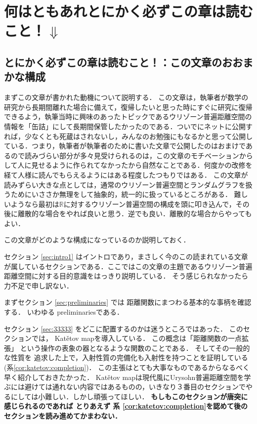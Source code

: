 \documentclass[leqno, 12pt]{jsarticle}
\newcommand{\rr}{\mathbb{R}}
\begin{document}
\section*{何はともあれとにかく必ずこの章は読むこと！$\Downarrow$}
\subsection{とにかく必ずこの章は読むこと！：この文章のおおまかな構成}

まずこの文章が書かれた動機について説明する．
この文章は，執筆者が数学の研究から長期間離れた場合に備えて，復帰したいと思った時にすぐに研究に復帰できるよう，執筆当時に興味のあったトピックであるウリゾーン普遍距離空間の情報を「缶詰」にして長期間保管したかったのである．ついでにネットに公開すれば，少なくとも死蔵はされないし，みんなのお勉強にもなるかと思って公開している．つまり，執筆者が執筆者のために書いた文章で公開したのはおまけであるので読みづらい部分が多々見受けられるのは，この文章のモチベーションからして人に見せるように作られてなかったから自然なことである．何度かの改修を経て人様に読んでもらえるようにはある程度したつもりではある．
この文章が読みずらい大きな点としては，通常のウリゾーン普遍空間とランダムグラフを扱うためにいささか無理をして抽象的，統一的に扱っているところがある．
難しいようなら最初は$\rr$に対するウリゾーン普遍空間の構成を頭に叩き込んで，その後に離散的な場合をやれば良いと思う．逆でも良い．離散的な場合からやってもよい．


この文章がどのような構成になっているのか説明しておく．


セクション
\ref{sec:intro1}
はイントロであり，まさしく今のこの読まれている文章が属しているセクションである．ここではこの文章の主題であるウリゾーン普遍距離空間に対する目的意識をはっきり説明している．
そう感じられなかったら力不足で申し訳ない．

まずセクション
\ref{sec:preliminaries}
では
距離関数にまつわる基本的な事柄を確認する．
いわゆる
preliminariesである．

セクション
\ref{sec:33333}
をどこに配置するのかは迷うところではあった．
このセクションでは，
Kat\v{e}tov mapを導入している．
この概念は「距離関数の一点拡張」
という操作の表象の器となるような関数のことである．
そしてその一般的な性質を
追求した上で，入射性質の完備化も入射性を持つことを証明している
(系\ref{cor:katetov:completion})．
この主張はとても大事なものであるからなるべく早く紹介しておきたかった．
Kat\v{e}tov mapは現代風にUrysohn普遍距離空間を学ぶには避けては通れない内容ではあるものの，いきなり３番目のセクションでやるにしては小難しい．しかし頑張ってほしい．
\textbf{もしもこのセクションが唐突に感じられるのであれば
とりあえず
系
\ref{cor:katetov:completion}を認めて後のセクションを読み進めてかまわない．}
\end{document}
